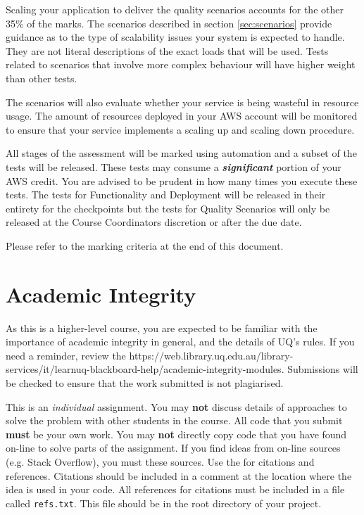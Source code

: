 \documentclass{csse4400}
\begin{document}
Scaling your application to deliver the quality scenarios accounts for the other 35\% of the marks. The scenarios described in section \ref{sec:scenarios} provide guidance as to the type of scalability issues your system is expected to handle. They are not literal descriptions of the exact loads that will be used. Tests related to scenarios that involve more complex behaviour will have higher weight than other tests.

The scenarios will also evaluate whether your service is being wasteful in resource usage. The amount of resources deployed in your AWS account will be monitored to ensure that your service implements a scaling up and scaling down procedure.

All stages of the assessment will be marked using automation and a subset of the tests will be released. These tests may consume a \textbf{\emph{significant}} portion of your AWS credit. You are advised to be prudent in how many times you execute these tests. The tests for Functionality and Deployment will be released in their entirety for the checkpoints but the tests for Quality Scenarios will only be released at the Course Coordinators discretion or after the due date.

Please refer to the marking criteria at the end of this document.

\section{Academic Integrity}
As this is a higher-level course, you are expected to be familiar with the importance of academic integrity in general, and the details of UQ's rules. If you need a reminder, review the  {https://web.library.uq.edu.au/library-services/it/learnuq-blackboard-help/academic-integrity-modules}. Submissions will be checked to ensure that the work submitted is not plagiarised.

This is an \textit{individual} assignment. You may \textbf{not} discuss details of approaches to solve the problem with other students in the course. All code that you submit \textbf{must} be your own work. You may \textbf{not} directly copy code that you have found on-line to solve parts of the assignment. If you find ideas from on-line sources (e.g. Stack Overflow), you must  these sources. Use the  for citations and references. Citations should be included in a comment at the location where the idea is used in your code. All references for citations must be included in a file called \texttt{refs.txt}. This file should be in the root directory of your project.
\end{document}
